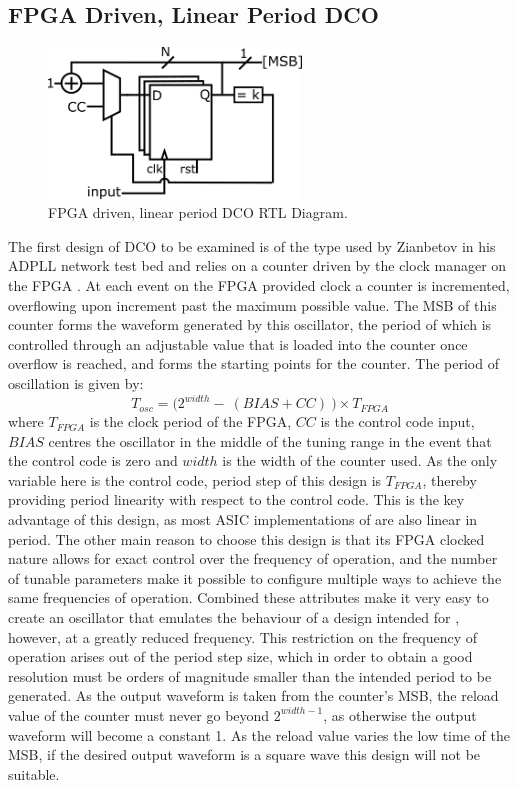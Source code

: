 \subsection{\acs{FPGA} Driven, Linear Period \acs{DCO}}
\begin{figure}[h]
	\centering
	\includegraphics[width=0.6\textwidth]{../osc1}
	\caption{\acs{FPGA} driven, linear period \acs{DCO} \ac{RTL} Diagram.}
	\label{fig:osc1}
\end{figure}
The first design of \ac{DCO} to be examined is of the type used by Zianbetov in his \ac{ADPLL} network test bed and relies on a counter driven by the clock manager on the \ac{FPGA} \cite{zianbetov2013phd}. At each event on the \ac{FPGA} provided clock a counter is incremented, overflowing upon increment past the maximum possible value. The \ac{MSB} of this counter forms the waveform generated by this oscillator, the period of which is controlled through an adjustable value that is loaded into the counter once overflow is reached, and forms the starting points for the counter. The period of oscillation is given by:
\begin{equation}
	T_{osc} = \big(2^{width} -~(BIAS+CC)~\big)\times T_{FPGA}
\end{equation}
where $T_{FPGA}$ is the clock period of the \ac{FPGA}, $CC$ is the control code input, $BIAS$ centres the oscillator in the middle of the tuning range in the event that the control code is zero and $width$ is the width of the counter used. As the only variable here is the control code, period step of this design is $T_{FPGA}$, thereby providing period linearity with respect to the control code. This is the key advantage of this design, as most \ac{ASIC} implementations of  are also linear in period. The other main reason to choose this design is that its \ac{FPGA} clocked nature allows for exact control over the frequency of operation, and the number of tunable parameters make it possible to configure multiple ways to achieve the same frequencies of operation. Combined these attributes make it very easy to create an oscillator that emulates the behaviour of a design intended for , however, at a greatly reduced frequency. This restriction on the frequency of operation arises out of the period step size, which in order to obtain a good resolution must be orders of magnitude smaller than the intended period to be generated. As the output waveform is taken from the counter's \ac{MSB}, the reload value of the counter must never go beyond $2^{width-1}$, as otherwise the output waveform will become a constant 1. As the reload value varies the low time of the \ac{MSB}, if the desired output waveform is a square wave this design will not be suitable.

